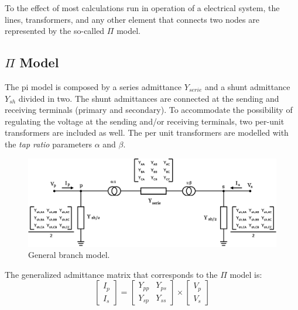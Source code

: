 \documentclass[nols,a4paper,twoside,notoc,fleqn]{tufte-book}
\begin{document}
To the effect of most calculations run in operation of a electrical system, the lines, transformers, and any other element that connects two nodes are represented by the so-called $\Pi$ model.


\subsection{$\Pi$ Model}


The pi model is composed by a series admittance  ${Y}_{serie}$ and a shunt admittance ${Y}_{sh}$ divided in two. The shunt admittances are connected at the sending and receiving terminals (primary and secondary). To accommodate the possibility of regulating the voltage at the sending and/or receiving terminals, two per-unit transformers are included as well. The per unit transformers are modelled with the \textit{tap ratio} parameters $\alpha$ and $\beta$.


\begin{center}
	\begin{figure}[h]
		\includegraphics[width=0.6\linewidth]{img/Branch.eps}
		\caption{General branch model.}
		\label{pi_model}
	\end{figure}
\end{center}

The generalized admittance matrix that corresponds to the $\Pi$ model is:
\begin{equation}
\left[\begin{array}{c}
{I}_p \\
{I}_s
\end{array}\right] = \left[\begin{array}{cc}
{Y}_{pp} & {Y}_{ps} \\
{Y}_{sp} & {Y}_{ss}
\end{array}\right] \times \left[\begin{array}{c}
{V}_p \\
{V}_s
\end{array}\right]
\label{pi_main_formula}
\end{equation}
\end{document}

